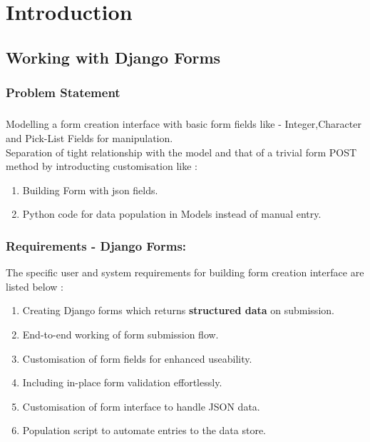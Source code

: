 \chapter{Introduction}
\section{Working with Django Forms}
\subsection{Problem Statement}
\paragraph{} Modelling a form creation interface with basic form fields like - Integer,Character and Pick-List Fields for manipulation.\\

Separation of tight relationship with the model and that of a trivial form POST method by introducting customisation like : 
 
           \begin{enumerate}
           	\item Building Form with json fields.
           	\item Python code for data population in Models instead of manual entry.
           \end{enumerate}

\subsection{Requirements - Django Forms:}
The specific user and system requirements for building form creation interface are listed below :\\
\begin{enumerate}
    \item Creating Django forms which returns \textbf{structured data} on submission.
    \item End-to-end working of form submission flow.
    \item Customisation of form fields for enhanced useability.
    \item Including in-place form validation effortlessly.
    \item Customisation of form interface to handle JSON data.
    \item Population script to automate entries to the data store.
    
\end{enumerate}

